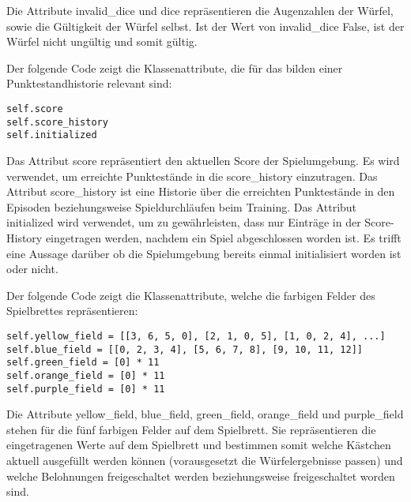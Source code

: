 Die Attribute invalid\_dice und dice repräsentieren die Augenzahlen der Würfel, sowie die Gültigkeit der Würfel selbst. Ist der Wert von invalid\_dice False, ist der Würfel nicht ungültig und somit gültig.\\

\begin{minipage}{\linewidth}
Der folgende Code zeigt die Klassenattribute, die für das bilden einer Punktestandhistorie relevant sind:
\vspace{0.5cm}
\begin{lstlisting}[caption={Klassenattribute für Punktestand}]
self.score
self.score_history
self.initialized
\end{lstlisting}
\end{minipage}

Das Attribut score repräsentiert den aktuellen Score der Spielumgebung. Es wird verwendet, um erreichte Punktestände in die score\_history einzutragen. Das Attribut score\_history ist eine Historie über die erreichten Punktestände in den Episoden beziehungsweise Spieldurchläufen beim Training. Das Attribut initialized wird verwendet, um zu gewährleisten, dass nur Einträge in der Score-History eingetragen werden, nachdem ein Spiel abgeschlossen worden ist. Es trifft eine Aussage darüber ob die Spielumgebung bereits einmal initialisiert worden ist oder nicht.\\

\begin{minipage}{\linewidth}
Der folgende Code zeigt die Klassenattribute, welche die farbigen Felder des Spielbrettes repräsentieren:
\vspace{0.5cm}
\begin{lstlisting}[caption={Klassenattribute für farbige Felder}]
self.yellow_field = [[3, 6, 5, 0], [2, 1, 0, 5], [1, 0, 2, 4], ...]
self.blue_field = [[0, 2, 3, 4], [5, 6, 7, 8], [9, 10, 11, 12]]
self.green_field = [0] * 11
self.orange_field = [0] * 11
self.purple_field = [0] * 11
\end{lstlisting}
\end{minipage}

Die Attribute yellow\_field, blue\_field, green\_field, orange\_field und purple\_field stehen für die fünf farbigen Felder auf dem Spielbrett. Sie repräsentieren die eingetragenen Werte auf dem Spielbrett und bestimmen somit welche Kästchen aktuell ausgefüllt werden können (vorausgesetzt die Würfelergebnisse passen) und welche Belohnungen freigeschaltet werden beziehungsweise freigeschaltet worden sind.\\

